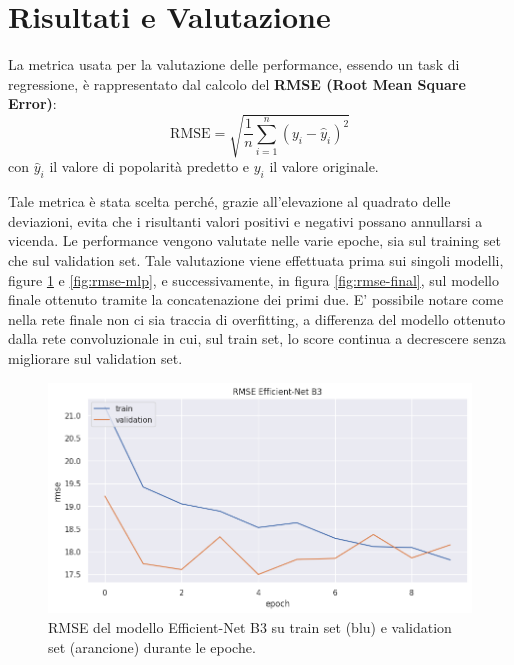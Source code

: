 \newpage


\section{Risultati e Valutazione}

La metrica usata per la valutazione delle performance, essendo un task di regressione, è rappresentato dal calcolo del \textbf{RMSE (Root Mean Square Error)}:
\[
\textrm{RMSE} = \sqrt{\frac{1}{n} \sum_{i=1}^{n} (y_i - \hat{y}_i)^2} 
\]
con $\hat{y}_i$ il valore di popolarità predetto e $y_i$ il valore originale.


Tale metrica è stata scelta perché, grazie all'elevazione al quadrato delle deviazioni, evita che i risultanti valori positivi e negativi possano annullarsi a vicenda. Le performance vengono valutate nelle varie epoche, sia sul training set che sul validation set. Tale valutazione viene effettuata prima sui singoli modelli, figure \ref{fig:rmse-cnn} e \ref{fig:rmse-mlp}, e successivamente, in figura \ref{fig:rmse-final}, sul modello finale ottenuto tramite la concatenazione dei primi due. E' possibile notare come nella rete finale non ci sia traccia di overfitting, a differenza del modello ottenuto dalla rete convoluzionale in cui, sul train set, lo score continua a decrescere senza migliorare sul validation set. 


    \begin{figure}[h]
        \centering
        \includegraphics[scale=0.6]{Plot/CNN_RMSE.png}
        \caption{RMSE del modello Efficient-Net B3 su train set (blu) e validation set (arancione) durante le epoche.}
        \label{fig:rmse-cnn}
    \end{figure}

\newpage


